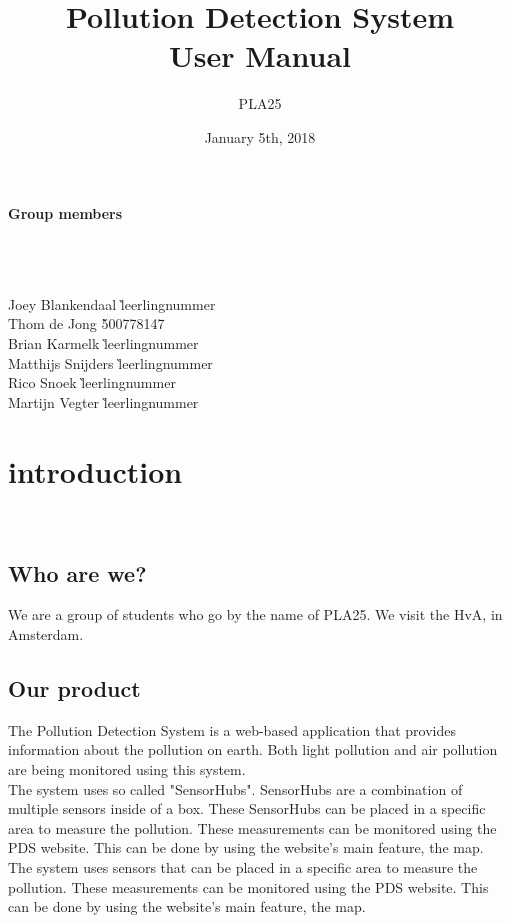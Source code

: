 \documentclass[a4paper]{article}
\title{Pollution Detection System\\User Manual}
\author{PLA25}
\date{January 5th, 2018}
\begin{document}
\clearpage
\maketitle
\vspace*{\fill}
\paragraph{Group members}
~\\\\
\begin{tabbing}
Joey Blankendaal \` leerlingnummer
\\
Thom de Jong \` 500778147
\\
Brian Karmelk \` leerlingnummer
\\
Matthijs Snijders \` leerlingnummer
\\
Rico Snoek \` leerlingnummer
\\
Martijn Vegter \` leerlingnummer
\end{tabbing}
\thispagestyle{empty}
\setcounter{page}{0}
\pagebreak
\tableofcontents
\pagebreak

\section{introduction}
~\\

\subsection{Who are we?}
We are a group of students who go by the name of PLA25. We visit the HvA, in Amsterdam.
~\\

\subsection{Our product}
The Pollution Detection System is a web-based application that provides information about the pollution on earth. Both light pollution and air pollution are being monitored using this system.
\\
\indent
The system uses so called "SensorHubs". SensorHubs are a combination of multiple sensors inside of a box. These SensorHubs can be placed in a specific area to measure the pollution. These measurements can be monitored using the PDS website. This can be done by using the website's main feature, the map.
The system uses sensors that can be placed in a specific area to measure the pollution. These measurements can be monitored using the PDS website. This can be done by using the website's main feature, the map.
\end{document}
